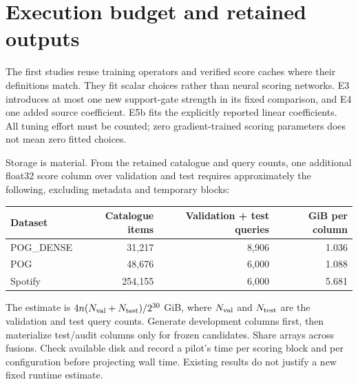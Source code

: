 \documentclass[11pt,a4paper]{article}
\begin{document}
\section{Execution budget and retained outputs}
\label{sec:execution}

The first studies reuse training operators and verified score caches where
their definitions match. They fit scalar choices rather than neural scoring
networks. E3 introduces at most one new support-gate strength in its fixed
comparison, and E4 one added source coefficient. E5b fits the explicitly
reported linear coefficients. All tuning effort must be counted; zero
gradient-trained scoring parameters does not mean zero fitted choices.

Storage is material. From the retained catalogue and query counts, one
additional float32 score column over validation and test requires approximately
the following, excluding metadata and temporary blocks:
\begin{center}
\begin{tabular}{@{}lrrr@{}}
\toprule
Dataset & Catalogue items & Validation + test queries & GiB per column\\
\midrule
POG\_DENSE & 31,217 & 8,906 & 1.036\\
POG & 48,676 & 6,000 & 1.088\\
Spotify & 254,155 & 6,000 & 5.681\\
\bottomrule
\end{tabular}
\end{center}
The estimate is $4n(N_{\rm val}+N_{\rm test})/2^{30}$ GiB, where
$N_{\rm val}$ and $N_{\rm test}$ are the validation and test query counts.
Generate development columns first, then materialize test/audit columns only
for frozen candidates. Share arrays across fusions. Check available disk and
record a pilot's time per scoring block and per configuration before projecting
wall time. Existing results do not justify a new fixed runtime estimate.
\end{document}
